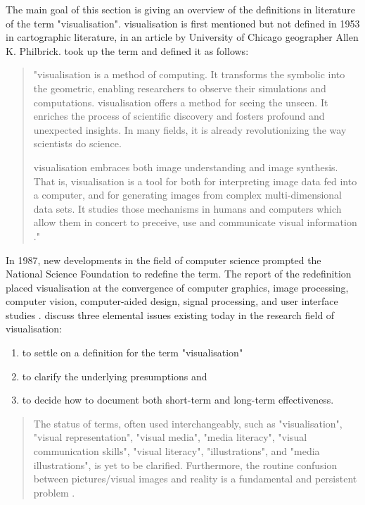 The main goal of this section is giving an overview of the definitions in literature of the term "visualisation". visualisation is first mentioned but not defined in 1953 in cartographic literature, in an article by University of Chicago geographer Allen K. Philbrick. \citeauthor{mccormick:1987} took up the term and defined it as follows:
\begin{quote}
 "visualisation is a method of computing. It transforms the symbolic into the geometric, enabling researchers to observe their simulations and computations. visualisation offers a method for seeing the unseen. It enriches the process of scientific discovery and fosters profound and unexpected insights. In many fields, it is already revolutionizing the way scientists do science.

 visualisation embraces both image understanding and image synthesis. That is, visualisation is a tool for both for interpreting image data fed into a computer, and for generating images from complex multi-dimensional data sets. It studies those mechanisms in humans and computers which allow them in concert to preceive, use and communicate visual information ."
\end{quote}

In 1987, new developments in the field of computer science prompted the National Science Foundation to redefine the term. The report of the redefinition placed visualisation at the convergence of computer graphics, image processing, computer vision, computer-aided design, signal processing, and user interface studies . \citeauthor{Phillips2010} discuss three elemental issues existing today in the research field of visualisation:

\begin{enumerate}
\item to settle on a definition for the term "visualisation"
\item to clarify the underlying presumptions and
\item to decide how to document both short-term and long-term effectiveness.
\end{enumerate}

\begin{quote}
The status of terms, often used interchangeably, such as "visualisation", "visual representation", "visual media", "media literacy", "visual communication skills", "visual literacy", "illustrations", and "media illustrations", is yet to be clarified. Furthermore, the routine confusion between pictures/visual images and reality is a fundamental and persistent problem .
\end{quote}

